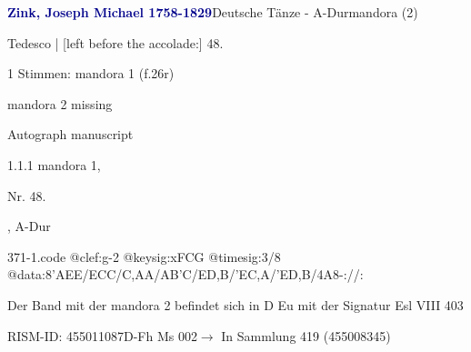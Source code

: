 \documentclass[twocolumn, 12pt]{book}
\begin{document}
\par \vspace{16pt} \textcolor{darkblue}{\textbf{Zink, Joseph Michael  1758-1829}}\hfillplus{\textbf{[371]}}\newline Deutsche Tänze - A-Dur\newline mandora (2)
\par \begin{itshape}[f.26r, at left:] Tedesco | [left before the accolade:] 48.\end{itshape} 
\par \textcolor{darkblue}{}  1 Stimmen: mandora 1  (f.26r)\newline \begin{small} mandora 2 missing\end{small} \newline Autograph manuscript
\par 1.1.1  mandora 1, \begin{itshape}Nr. 48.\end{itshape}, A-Dur  
\begin{filecontents*}{371-1.code}
@clef:g-2
@keysig:xFCG
@timesig:3/8
@data:{8'AEE}/{ECC}/{C,AA}/{AB'C}/{ED,B}/{'EC,A}/{'ED,B}/4A8-://:
\end{filecontents*}
\newline %
\par Der Band mit der mandora 2 befindet sich in D Eu mit der Signatur Esl VIII 403
\par RISM-ID: 455011087\newline D-Fh  Ms 002\newline $\rightarrow$ In Sammlung 419 (455008345)
      
\end{document}
